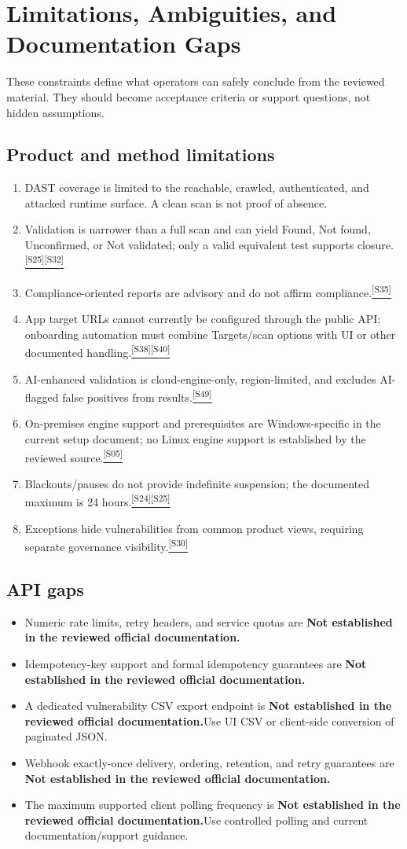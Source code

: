 \documentclass[11pt,letterpaper,oneside]{scrreprt}
\newcommand{\src}[1]{\hyperref[src:#1]{\textsuperscript{\color{R7Orange}[#1]}}}
\newcommand{\notestablished}{\textbf{Not established in the reviewed official documentation.}}
\newcommand{\chapterlead}[1]{\begin{tcolorbox}[enhanced,colback=R7Light,colframe=R7Light,boxrule=0pt,borderline west={3pt}{0pt}{R7Orange},arc=0pt,left=9pt,right=9pt,top=7pt,bottom=7pt]#1\end{tcolorbox}}
\begin{document}
\chapter{Limitations, Ambiguities, and Documentation Gaps}
\chapterlead{These constraints define what operators can safely conclude from the reviewed material. They should become acceptance criteria or support questions, not hidden assumptions.}

\section{Product and method limitations}
\begin{enumerate}
  \item DAST coverage is limited to the reachable, crawled, authenticated, and attacked runtime surface. A clean scan is not proof of absence.
  \item Validation is narrower than a full scan and can yield Found, Not found, Unconfirmed, or Not validated; only a valid equivalent test supports closure.\src{S25}\src{S32}
  \item Compliance-oriented reports are advisory and do not affirm compliance.\src{S35}
  \item App target URLs cannot currently be configured through the public API; onboarding automation must combine Targets/scan options with UI or other documented handling.\src{S38}\src{S40}
  \item AI-enhanced validation is cloud-engine-only, region-limited, and excludes AI-flagged false positives from results.\src{S49}
  \item On-premises engine support and prerequisites are Windows-specific in the current setup document; no Linux engine support is established by the reviewed source.\src{S05}
  \item Blackouts/pauses do not provide indefinite suspension; the documented maximum is 24 hours.\src{S24}\src{S25}
  \item Exceptions hide vulnerabilities from common product views, requiring separate governance visibility.\src{S30}
\end{enumerate}

\section{API gaps}
\begin{itemize}
  \item Numeric rate limits, retry headers, and service quotas are \notestablished
  \item Idempotency-key support and formal idempotency guarantees are \notestablished
  \item A dedicated vulnerability CSV export endpoint is \notestablished Use UI CSV or client-side conversion of paginated JSON.
  \item Webhook exactly-once delivery, ordering, retention, and retry guarantees are \notestablished
  \item The maximum supported client polling frequency is \notestablished Use controlled polling and current documentation/support guidance.
\end{itemize}
\end{document}
